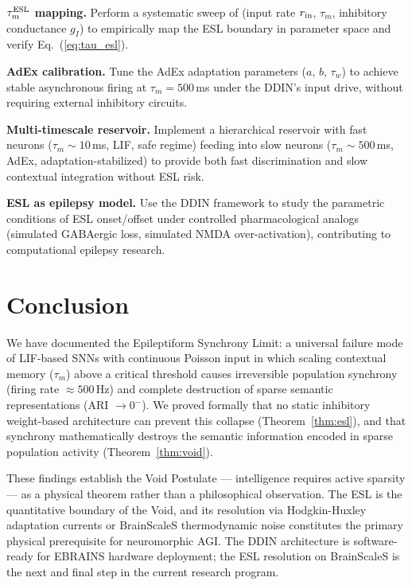 \documentclass{article}
\begin{document}
\textbf{$\tau_m^{\rm ESL}$ mapping.} Perform a systematic sweep of (input rate $r_{\rm in}$, $\tau_m$, inhibitory conductance $g_I$) to empirically map the ESL boundary in parameter space and verify Eq.~(\ref{eq:tau_esl}).

\textbf{AdEx calibration.} Tune the AdEx adaptation parameters ($a$, $b$, $\tau_w$) to achieve stable asynchronous firing at $\tau_m = 500$\,ms under the DDIN's input drive, without requiring external inhibitory circuits.

\textbf{Multi-timescale reservoir.} Implement a hierarchical reservoir with fast neurons ($\tau_m \sim 10$\,ms, LIF, safe regime) feeding into slow neurons ($\tau_m \sim 500$\,ms, AdEx, adaptation-stabilized) to provide both fast discrimination and slow contextual integration without ESL risk.

\textbf{ESL as epilepsy model.} Use the DDIN framework to study the parametric conditions of ESL onset/offset under controlled pharmacological analogs (simulated GABAergic loss, simulated NMDA over-activation), contributing to computational epilepsy research.

\section{Conclusion}

We have documented the Epileptiform Synchrony Limit: a universal failure mode of LIF-based SNNs with continuous Poisson input in which scaling contextual memory ($\tau_m$) above a critical threshold causes irreversible population synchrony (firing rate $\approx 500$\,Hz) and complete destruction of sparse semantic representations (ARI $\to 0^-$). We proved formally that no static inhibitory weight-based architecture can prevent this collapse (Theorem~\ref{thm:esl}), and that synchrony mathematically destroys the semantic information encoded in sparse population activity (Theorem~\ref{thm:void}).

These findings establish the Void Postulate --- intelligence requires active sparsity --- as a physical theorem rather than a philosophical observation. The ESL is the quantitative boundary of the Void, and its resolution via Hodgkin-Huxley adaptation currents or BrainScaleS thermodynamic noise constitutes the primary physical prerequisite for neuromorphic AGI. The DDIN architecture is software-ready for EBRAINS hardware deployment; the ESL resolution on BrainScaleS is the next and final step in the current research program.
\end{document}
